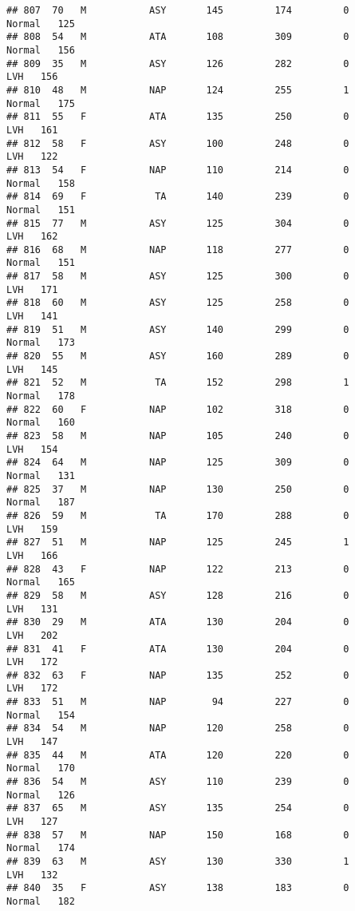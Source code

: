 \documentclass[
]{article}
\begin{document}
\begin{verbatim}
## 807  70   M           ASY       145         174         0     Normal   125
## 808  54   M           ATA       108         309         0     Normal   156
## 809  35   M           ASY       126         282         0        LVH   156
## 810  48   M           NAP       124         255         1     Normal   175
## 811  55   F           ATA       135         250         0        LVH   161
## 812  58   F           ASY       100         248         0        LVH   122
## 813  54   F           NAP       110         214         0     Normal   158
## 814  69   F            TA       140         239         0     Normal   151
## 815  77   M           ASY       125         304         0        LVH   162
## 816  68   M           NAP       118         277         0     Normal   151
## 817  58   M           ASY       125         300         0        LVH   171
## 818  60   M           ASY       125         258         0        LVH   141
## 819  51   M           ASY       140         299         0     Normal   173
## 820  55   M           ASY       160         289         0        LVH   145
## 821  52   M            TA       152         298         1     Normal   178
## 822  60   F           NAP       102         318         0     Normal   160
## 823  58   M           NAP       105         240         0        LVH   154
## 824  64   M           NAP       125         309         0     Normal   131
## 825  37   M           NAP       130         250         0     Normal   187
## 826  59   M            TA       170         288         0        LVH   159
## 827  51   M           NAP       125         245         1        LVH   166
## 828  43   F           NAP       122         213         0     Normal   165
## 829  58   M           ASY       128         216         0        LVH   131
## 830  29   M           ATA       130         204         0        LVH   202
## 831  41   F           ATA       130         204         0        LVH   172
## 832  63   F           NAP       135         252         0        LVH   172
## 833  51   M           NAP        94         227         0     Normal   154
## 834  54   M           NAP       120         258         0        LVH   147
## 835  44   M           ATA       120         220         0     Normal   170
## 836  54   M           ASY       110         239         0     Normal   126
## 837  65   M           ASY       135         254         0        LVH   127
## 838  57   M           NAP       150         168         0     Normal   174
## 839  63   M           ASY       130         330         1        LVH   132
## 840  35   F           ASY       138         183         0     Normal   182

\end{verbatim}
\end{document}

